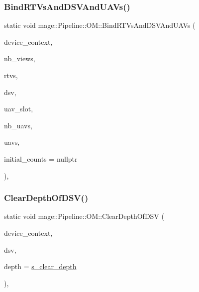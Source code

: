 \subsubsection{\texorpdfstring{Bind\+R\+T\+Vs\+And\+D\+S\+V\+And\+U\+A\+Vs()}{BindRTVsAndDSVAndUAVs()}}
{\footnotesize\ttfamily static void mage\+::\+Pipeline\+::\+O\+M\+::\+Bind\+R\+T\+Vs\+And\+D\+S\+V\+And\+U\+A\+Vs (\begin{DoxyParamCaption}\item[{I\+D3\+D11\+Device\+Context4 $\ast$}]{device\+\_\+context,  }\item[{\hyperlink{namespacemage_a41c104c036fba3756a74e19f793eeaa1}{U32}}]{nb\+\_\+views,  }\item[{I\+D3\+D11\+Render\+Target\+View $\ast$const $\ast$}]{rtvs,  }\item[{I\+D3\+D11\+Depth\+Stencil\+View $\ast$}]{dsv,  }\item[{\hyperlink{namespacemage_a41c104c036fba3756a74e19f793eeaa1}{U32}}]{uav\+\_\+slot,  }\item[{\hyperlink{namespacemage_a41c104c036fba3756a74e19f793eeaa1}{U32}}]{nb\+\_\+uavs,  }\item[{I\+D3\+D11\+Unordered\+Access\+View $\ast$const $\ast$}]{uavs,  }\item[{const \hyperlink{namespacemage_a41c104c036fba3756a74e19f793eeaa1}{U32} $\ast$}]{initial\+\_\+counts = {\ttfamily nullptr} }\end{DoxyParamCaption})\hspace{0.3cm}{\ttfamily [static]}, {\ttfamily [noexcept]}}

\hypertarget{structmage_1_1_pipeline_1_1_o_m_abda5e617e00694156a61d0343ae70804}{}\label{structmage_1_1_pipeline_1_1_o_m_abda5e617e00694156a61d0343ae70804} 
\subsubsection{\texorpdfstring{Clear\+Depth\+Of\+D\+S\+V()}{ClearDepthOfDSV()}}
{\footnotesize\ttfamily static void mage\+::\+Pipeline\+::\+O\+M\+::\+Clear\+Depth\+Of\+D\+SV (\begin{DoxyParamCaption}\item[{I\+D3\+D11\+Device\+Context4 $\ast$}]{device\+\_\+context,  }\item[{I\+D3\+D11\+Depth\+Stencil\+View $\ast$}]{dsv,  }\item[{\hyperlink{namespacemage_aa97e833b45f06d60a0a9c4fc22ae02c0}{F32}}]{depth = {\ttfamily \hyperlink{structmage_1_1_pipeline_1_1_o_m_a24388e030eff7d28a3b1fb59f3cf57d5}{s\+\_\+clear\+\_\+depth}} }\end{DoxyParamCaption})\hspace{0.3cm}{\ttfamily [static]}, {\ttfamily [noexcept]}}

